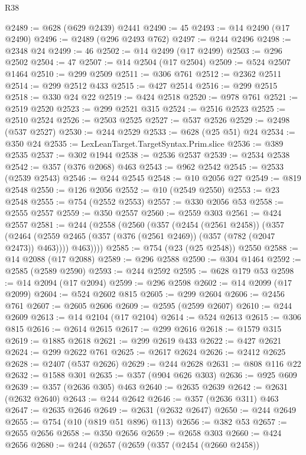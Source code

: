 \begin{lexlean}{R38}
\begin{coremodule}
@2489 := @628 (@629 @2439) @2441
@2490 := 45
@2493 := @14 @2490 (@17 @2490)
@2496 := @2489 (@296 @2493 @762)
@2497 := @244 @2496
@2498 := @2348 @24
@2499 := 46
@2502 := @14 @2499 (@17 @2499)
@2503 := @296 @2502
@2504 := 47
@2507 := @14 @2504 (@17 @2504)
@2509 := @524 @2507 @1464
@2510 := @299 @2509
@2511 := @306 @761
@2512 := @2362 @2511
@2514 := @299 @2512 @433
@2515 := @427 @2514
@2516 := @299 @2515
@2518 := @330 @24 @22
@2519 := @424 @2518
@2520 := @978 @761
@2521 := @2519 @2520
@2523 := @299 @2521 @315
@2524 := @2516 @2523
@2525 := @2510 @2524
@2526 := @2503 @2525
@2527 := @537 @2526
@2529 := @2498 (@537 @2527)
@2530 := @244 @2529
@2533 := @628 (@25 @51) @24
@2534 := @350 @24
@2535 := LexLeanTarget.TargetSyntax.Prim.slice
@2536 := @389 @2535
@2537 := @302 @1944
@2538 := @2536 @2537
@2539 := @2534 @2538
@2542 := @357 (@376 @2068) @463
@2543 := @962 @2542
@2545 := @2533 (@2539 @2543)
@2546 := @244 @2545
@2548 := @10 @2056 @27
@2549 := @819 @2548
@2550 := @126 @2056
@2552 := @10 (@2549 @2550)
@2553 := @23 @2548
@2555 := @754 (@2552 @2553)
@2557 := @330 @2056 @53
@2558 := @2555 @2557
@2559 := @350 @2557
@2560 := @2559 @303
@2561 := @424 @2557
@2581 := @244
    (@2558
      (@2560
        (@357
          (@2454 (@2561 @2458))
          (@357
            (@2464 (@2559 @2465 (@357 (@376 (@2561 @2469)) (@357 (@782 (@2047 @2473)) @463))))
            @463))))
@2585 := @754 (@23 (@25 @2548)) @2550
@2588 := @14 @2088 (@17 @2088)
@2589 := @296 @2588
@2590 := @304 @1464
@2592 := @2585 (@2589 @2590)
@2593 := @244 @2592
@2595 := @628 @179 @53
@2598 := @14 @2094 (@17 @2094)
@2599 := @296 @2598
@2602 := @14 @2099 (@17 @2099)
@2604 := @524 @2602 @815
@2605 := @299 @2604
@2606 := @2456 @761
@2607 := @2605 @2606
@2609 := @2595 (@2599 @2607)
@2610 := @244 @2609
@2613 := @14 @2104 (@17 @2104)
@2614 := @524 @2613
@2615 := @306 @815
@2616 := @2614 @2615
@2617 := @299 @2616
@2618 := @1579 @315
@2619 := @1885 @2618
@2621 := @299 @2619 @433
@2622 := @427 @2621
@2624 := @299 @2622 @761
@2625 := @2617 @2624
@2626 := @2412 @2625
@2628 := @2407 (@537 @2626)
@2629 := @244 @2628
@2631 := @808 @116 @22
@2632 := @1588 @301
@2635 := @357 (@904 @626 @303)
@2636 := @925 @609
@2639 := @357 (@2636 @305) @463
@2640 := @2635 @2639
@2642 := @2631 (@2632 @2640)
@2643 := @244 @2642
@2646 := @357 (@2636 @311) @463
@2647 := @2635 @2646
@2649 := @2631 (@2632 @2647)
@2650 := @244 @2649
@2655 := @754 (@10 (@819 @51 @896) @113)
@2656 := @382 @53
@2657 := @2655 @2656
@2658 := @350 @2656
@2659 := @2658 @303
@2660 := @424 @2656
@2680 := @244
    (@2657
      (@2659
        (@357
          (@2454 (@2660 @2458))

\end{coremodule}
\end{lexlean}
